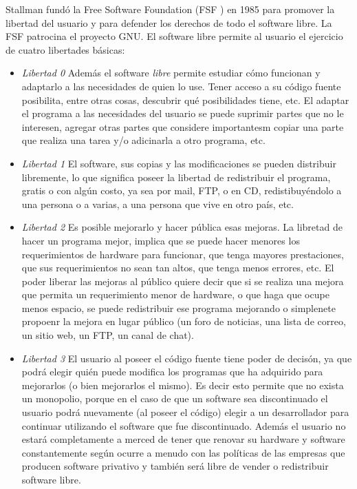 Stallman fundó la Free Software Foundation (FSF ) en 1985 para promover la libertad del usuario y para defender los derechos de todo el software libre\cite{Etiqueta14}. La FSF patrocina el proyecto GNU. El software libre permite al usuario el ejercicio de cuatro libertades básicas:

\begin {itemize}
\item
 \textit{Libertad 0} Además el software \textit{libre} permite estudiar cómo funcionan y adaptarlo a las necesidades de quien lo use. Tener acceso a su código fuente posibilita, entre otras cosas, descubrir qué posibilidades tiene, etc. El adaptar el programa a las necesidades del usuario se puede suprimir partes que no le interesen, agregar otras partes que considere importantesm copiar una parte que realiza una tarea y/o adicinarla a otro programa, etc.

\item
\textit{Libertad 1} El software, sus copias y las modificaciones se pueden distribuir libremente, lo que significa poseer la libertad de redistribuir el programa, gratis o con algún costo, ya sea por mail, FTP, o en CD, redistibuyéndolo a una persona o a varias, a una persona que vive en otro país, etc.

\item 
\textit{Libertad 2} Es posible mejorarlo y hacer pública esas mejoras. La libretad de hacer un programa mejor, implica que se puede hacer menores los requerimientos de hardware para funcionar, que tenga mayores prestaciones, que sus requerimientos no sean tan altos, que tenga menos errores, etc. El poder liberar las mejoras al público quiere decir que si se realiza una mejora que permita un requerimiento menor de hardware, o que haga que ocupe menos espacio, se puede redistribuir ese programa mejorando o simplenete propoenr la mejora en lugar público (un foro de noticias, una lista de correo, un sitio web, un FTP, un canal de chat).

\item 
\textit{Libertad 3} El usuario al poseer el código fuente tiene poder de decisón, ya que podrá elegir quién puede modifica los programas que ha adquirido para mejorarlos (o bien mejorarlos el mismo). Es decir esto permite que no exista un monopolio, porque en el caso de que un software sea discontinuado el usuario podrá nuevamente (al poseer el código) elegir a un desarrollador para continuar utilizando el software que fue discontinuado. Además el usuario no estará completamente a merced de tener que renovar su hardware y software constantemente según ocurre a menudo con las políticas de las empresas que producen software privativo y también será libre de vender o redistribuir software libre.
 
 \end {itemize}
 
